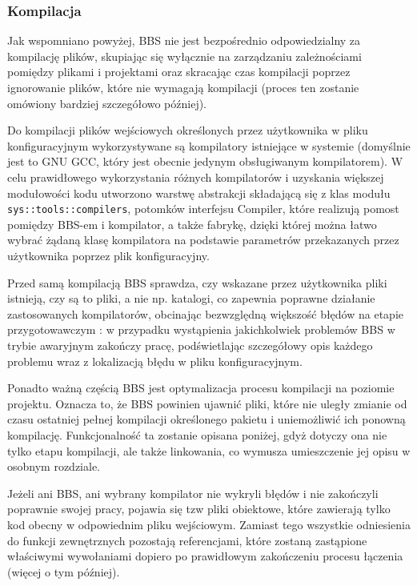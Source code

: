 \subsubsection{Kompilacja}
Jak wspomniano powyżej, BBS nie jest bezpośrednio odpowiedzialny za kompilację plików, skupiając się wyłącznie na zarządzaniu zależnościami pomiędzy plikami i projektami oraz skracając czas kompilacji poprzez ignorowanie plików, które nie wymagają kompilacji (proces ten zostanie omówiony bardziej szczegółowo później).

Do kompilacji plików wejściowych określonych przez użytkownika w pliku konfiguracyjnym wykorzystywane są kompilatory istniejące w systemie (domyślnie jest to GNU GCC, który jest obecnie jedynym obsługiwanym kompilatorem). W celu prawidłowego wykorzystania różnych kompilatorów i uzyskania większej modułowości kodu utworzono warstwę abstrakcji składającą się z klas modułu \texttt{sys::tools::compilers}, potomków interfejsu Compiler, które realizują pomost pomiędzy BBS-em i kompilator, a także fabrykę, dzięki której można łatwo wybrać żądaną klasę kompilatora na podstawie parametrów przekazanych przez użytkownika poprzez plik konfiguracyjny.

Przed samą kompilacją BBS sprawdza, czy wskazane przez użytkownika pliki istnieją, czy są to pliki, a nie np. katalogi, co zapewnia poprawne działanie zastosowanych kompilatorów, obcinając bezwzględną większość błędów na etapie przygotowawczym : w przypadku wystąpienia jakichkolwiek problemów BBS w trybie awaryjnym zakończy pracę, podświetlając szczegółowy opis każdego problemu wraz z lokalizacją błędu w pliku konfiguracyjnym.

Ponadto ważną częścią BBS jest optymalizacja procesu kompilacji na poziomie projektu. Oznacza to, że BBS powinien ujawnić pliki, które nie uległy zmianie od czasu ostatniej pełnej kompilacji określonego pakietu i uniemożliwić ich ponowną kompilację. Funkcjonalność ta zostanie opisana poniżej, gdyż dotyczy ona nie tylko etapu kompilacji, ale także linkowania, co wymusza umieszczenie jej opisu w osobnym rozdziale.

Jeżeli ani BBS, ani wybrany kompilator nie wykryli błędów i nie zakończyli poprawnie swojej pracy, pojawia się tzw pliki obiektowe, które zawierają tylko kod obecny w odpowiednim pliku wejściowym. Zamiast tego wszystkie odniesienia do funkcji zewnętrznych pozostają referencjami, które zostaną zastąpione właściwymi wywołaniami dopiero po prawidłowym zakończeniu procesu łączenia (więcej o tym później).

